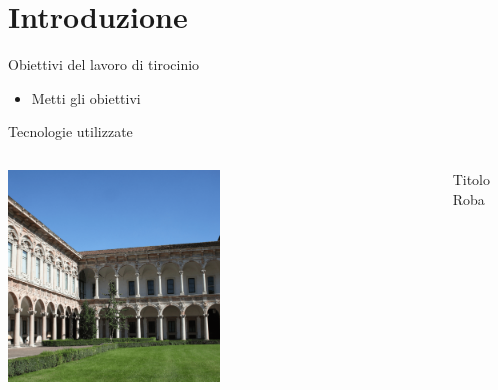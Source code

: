 \section{Introduzione}


\begin{frame}{Obiettivi del lavoro di tirocinio}

\begin{itemize}[<+->]
    \item Metti gli obiettivi
\end{itemize}

\end{frame}


\begin{frame}{Tecnologie utilizzate}

\begin{columns}
    \begin{column}{0.5\textwidth}
        \includegraphics[width=0.5\textwidth]{assets/background_alternative.png}
    \end{column}
    \begin{column}{0.5\textwidth}
        \begin{block}{Titolo}
            Roba
        \end{block}
    \end{column}
\end{columns}

\end{frame}


